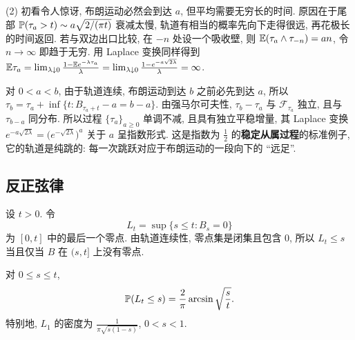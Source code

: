 \begin{intuition}
(2) 初看令人惊讶, 布朗运动必然会到达 $a$, 但平均需要无穷长的时间. 原因在于尾部 $\P(\tau_a>t)\sim a\sqrt{2/(\pi t)}$ 衰减太慢, 轨道有相当的概率先向下走得很远, 再花极长的时间返回. 若与双边出口比较, 在 $-n$ 处设一个吸收壁, 则 $\E(\tau_a\wedge\tau_{-n})=an$, 令 $n\to\infty$ 即趋于无穷. 用 Laplace 变换同样得到 $\E\tau_a=\lim_{\lambda\downarrow0}\frac{1-\E e^{-\lambda\tau_a}}{\lambda}=\lim_{\lambda\downarrow0}\frac{1-e^{-a\sqrt{2\lambda}}}{\lambda}=\infty$.
\end{intuition}

\begin{remark}[首达时过程]
对 $0<a<b$, 由于轨道连续, 布朗运动到达 $b$ 之前必先到达 $a$, 所以 $\tau_b=\tau_a+\inf\{t: B_{\tau_a+t}-a=b-a\}$. 由强马尔可夫性, $\tau_b-\tau_a$ 与 $\mathcal{F}_{\tau_a}$ 独立, 且与 $\tau_{b-a}$ 同分布. 所以过程 $\{\tau_a\}_{a\ge0}$ 单调不减, 且具有独立平稳增量, 其 Laplace 变换 $e^{-a\sqrt{2\lambda}}=\big(e^{-\sqrt{2\lambda}}\big)^a$ 关于 $a$ 呈指数形式. 这是指数为 $\frac{1}{2}$ 的\textbf{稳定从属过程}的标准例子, 它的轨道是纯跳的: 每一次跳跃对应于布朗运动的一段向下的 ``远足''.
\end{remark}

\subsection{反正弦律}

设 $t>0$. 令
\[
L_t=\sup\{s\le t: B_s=0\}
\]
为 $[0,t]$ 中的最后一个零点. 由轨道连续性, 零点集是闭集且包含 $0$, 所以 $L_t\le s$ 当且仅当 $B$ 在 $(s,t]$ 上没有零点.

\begin{theorem}\label{thm:arcsine}
对 $0\le s\le t$,
\[
\P(L_t\le s)=\frac{2}{\pi}\arcsin\sqrt{\frac{s}{t}}.
\]
特别地, $L_1$ 的密度为 $\frac{1}{\pi\sqrt{s(1-s)}}$, $0<s<1$.
\end{theorem}

